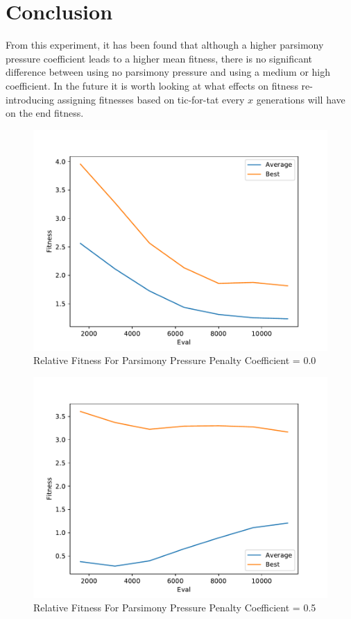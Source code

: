 \documentclass[times]{article}
\begin{document}
	\section{Conclusion}

	From this experiment, it has been found that although a higher parsimony pressure coefficient leads to a higher mean fitness, there is no significant difference between using no parsimony pressure and using a medium or high coefficient. In the future it is worth looking at what effects on fitness re-introducing assigning fitnesses based on tic-for-tat every $x$ generations will have on the end fitness.

	\begin{figure}
		\caption{Relative Fitness For Parsimony Pressure Penalty Coefficient = 0.0}
		\label{fig:relative_plot_0}
		\includegraphics[width=\textwidth]{../graph/graphs/0.pdf}
	\end{figure}

	\begin{figure}
		\caption{Relative Fitness For Parsimony Pressure Penalty Coefficient = 0.5}
		\label{fig:relative_plot_1}
		\includegraphics[width=\textwidth]{../graph/graphs/1.pdf}
	\end{figure}
\end{document}
